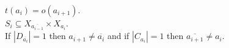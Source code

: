 \documentclass[preview]{standalone}
\begin{document}
$t(a_i) = o(a_{i+1})$.\\$S_i \subseteq X_{\overline{a_{i-1}}} \times X_{a_i}$.\\If $\left|D_{\overline{a_i}}\right| = 1$ then $a_{i+1} \not= \overline{a_i}$ and if $\left|C_{a_i}\right| = 1$ then $\overline{a_{i+1}} \not= a_i$.\\
\end{document}
